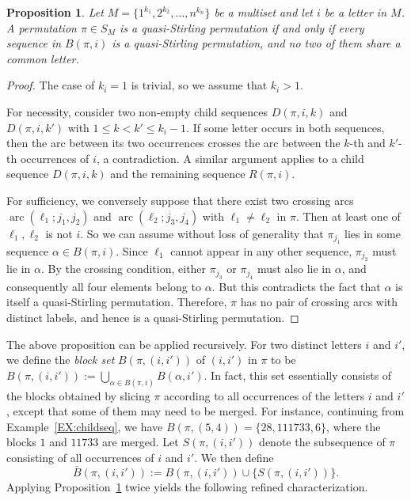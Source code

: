 \documentclass[11pt]{article}
\DeclareMathOperator{\ar}{arc}
\numberwithin{equation}{section}
\newtheorem{prop}[thm]{Proposition}
\begin{document}
\begin{prop}\label{PROP:test-1}
	Let $M=\{1^{k_1},2^{k_2},\ldots,n^{k_n}\}$ be a multiset and let $i$ be a letter in $M$. A permutation $\pi\in S_M$ is a quasi-Stirling permutation if and only if every sequence in $B(\pi,i)$ is a quasi-Stirling permutation, and no two of them share a common letter.
\end{prop}
\begin{proof}
	The case of $k_i=1$ is trivial, so we assume that $k_i>1$.
	
	For necessity, consider two non-empty child sequences $D(\pi,i,k)$ and $D(\pi,i,k')$ with $1\le k<k'\le k_i-1$. If some letter occurs in both sequences, then the arc between its two occurrences crosses the arc between the $k$-th and $k'$-th occurrences of $i$, a contradiction. A similar argument applies to a child sequence $D(\pi,i,k)$ and the remaining sequence $R(\pi,i)$.
	
	For sufficiency, we conversely suppose that there exist two crossing arcs $\ar(\ell_1;j_1,j_2)$ and $\ar(\ell_2;j_3,j_4)$ with $\ell_1\neq\ell_2$ in $\pi$. Then at least one of $\ell_1,\ell_2$ is not $i$. So we can assume without loss of generality that $\pi_{j_1}$ lies in some sequence $\alpha\in B(\pi,i)$. Since $\ell_1$ cannot appear in any other sequence, $\pi_{j_2}$ must lie in $\alpha$. By the crossing condition, either $\pi_{j_3}$ or $\pi_{j_4}$ must also lie in $\alpha$, and consequently all four elements belong to $\alpha$. But this contradicts the fact that $\alpha$ is itself a quasi-Stirling permutation. Therefore, $\pi$ has no pair of crossing arcs with distinct labels, and hence is a quasi-Stirling permutation.
\end{proof}

The above proposition can be applied recursively. For two distinct letters $i$ and $i'$, we define the \textit{block set} $B(\pi,(i,i'))$ of $(i,i')$ in $\pi$ to be
$
B(\pi,(i,i')):=\bigcup_{\alpha\in B(\pi,i)} B(\alpha,i').
$
In fact, this set essentially consists of the blocks obtained by slicing $\pi$ according to all occurrences of the letters $i$ and $i'$, except that some of them may need to be merged.
For instance, continuing from Example~\ref{EX:childseq}, we have $B(\pi,(5,4))=\{28,111733,6\}$, where the blocks $1$ and $11733$ are merged. Let $S(\pi,(i,i'))$ denote the subsequence of $\pi$ consisting of all occurrences of $i$ and $i'$. We then define
\[
\bar{B}(\pi,(i,i')):=B(\pi,(i,i'))\cup \{S(\pi,(i,i'))\}.
\]
Applying Proposition~\ref{PROP:test-1} twice yields the following refined characterization.
\end{document}
